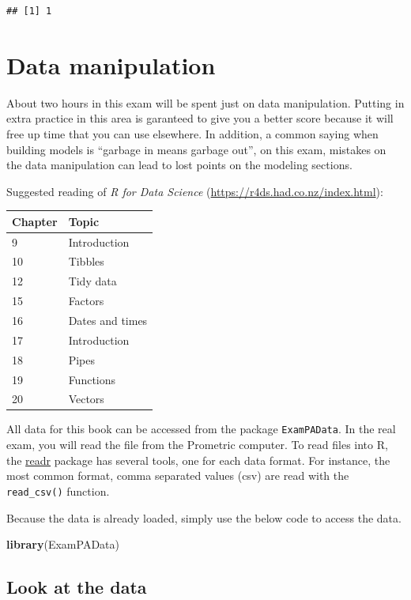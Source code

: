 \documentclass[openany]{book}
\newenvironment{Shaded}{\begin{snugshade}}{\end{snugshade}}
\newcommand{\KeywordTok}[1]{\textcolor[rgb]{0.13,0.29,0.53}{\textbf{#1}}}
\newcommand{\NormalTok}[1]{#1}
\begin{document}
\begin{verbatim}
## [1] 1
\end{verbatim}

\hypertarget{data-manipulation}{%
\chapter{Data manipulation}\label{data-manipulation}}

About two hours in this exam will be spent just on data manipulation. Putting in extra practice in this area is garanteed to give you a better score because it will free up time that you can use elsewhere. In addition, a common saying when building models is ``garbage in means garbage out'', on this exam, mistakes on the data manipulation can lead to lost points on the modeling sections.

Suggested reading of \emph{R for Data Science} (\url{https://r4ds.had.co.nz/index.html}):

\begin{longtable}[]{@{}ll@{}}
\toprule
Chapter & Topic\tabularnewline
\midrule
\endhead
9 & Introduction\tabularnewline
10 & Tibbles\tabularnewline
12 & Tidy data\tabularnewline
15 & Factors\tabularnewline
16 & Dates and times\tabularnewline
17 & Introduction\tabularnewline
18 & Pipes\tabularnewline
19 & Functions\tabularnewline
20 & Vectors\tabularnewline
\bottomrule
\end{longtable}

All data for this book can be accessed from the package \texttt{ExamPAData}. In the real exam, you will read the file from the Prometric computer. To read files into R, the \href{https://readr.tidyverse.org/articles/readr.html}{readr} package has several tools, one for each data format. For instance, the most common format, comma separated values (csv) are read with the \texttt{read\_csv()} function.

Because the data is already loaded, simply use the below code to access the data.

\begin{Shaded}
\begin{Highlighting}[]
\KeywordTok{library}\NormalTok{(ExamPAData)}
\end{Highlighting}
\end{Shaded}

\hypertarget{look-at-the-data}{%
\section{Look at the data}\label{look-at-the-data}}
\end{document}
